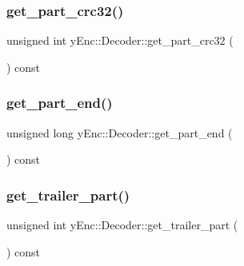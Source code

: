 \hypertarget{classy_enc_1_1_decoder_abd4a081667ca8f1190bfcfc8e6d7639c}{}\label{classy_enc_1_1_decoder_abd4a081667ca8f1190bfcfc8e6d7639c} 
\subsubsection{\texorpdfstring{get\+\_\+part\+\_\+crc32()}{get\_part\_crc32()}}
{\footnotesize\ttfamily unsigned int y\+Enc\+::\+Decoder\+::get\+\_\+part\+\_\+crc32 (\begin{DoxyParamCaption}{ }\end{DoxyParamCaption}) const\hspace{0.3cm}{\ttfamily [inline]}}

\hypertarget{classy_enc_1_1_decoder_a25b2f60414a2b3d4c3fff0c2e81a4987}{}\label{classy_enc_1_1_decoder_a25b2f60414a2b3d4c3fff0c2e81a4987} 
\subsubsection{\texorpdfstring{get\+\_\+part\+\_\+end()}{get\_part\_end()}}
{\footnotesize\ttfamily unsigned long y\+Enc\+::\+Decoder\+::get\+\_\+part\+\_\+end (\begin{DoxyParamCaption}{ }\end{DoxyParamCaption}) const\hspace{0.3cm}{\ttfamily [inline]}}

\hypertarget{classy_enc_1_1_decoder_ade08ae4673a91d7ba032d0d4d7815172}{}\label{classy_enc_1_1_decoder_ade08ae4673a91d7ba032d0d4d7815172} 
\subsubsection{\texorpdfstring{get\+\_\+trailer\+\_\+part()}{get\_trailer\_part()}}
{\footnotesize\ttfamily unsigned int y\+Enc\+::\+Decoder\+::get\+\_\+trailer\+\_\+part (\begin{DoxyParamCaption}{ }\end{DoxyParamCaption}) const\hspace{0.3cm}{\ttfamily [inline]}}

